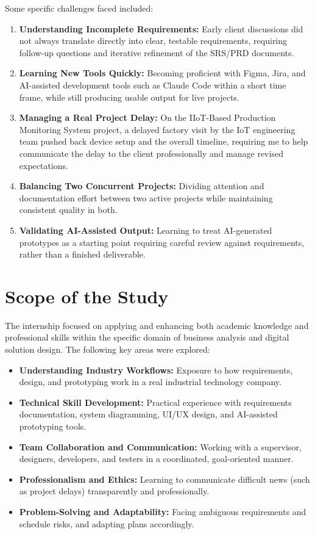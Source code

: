 \par Some specific challenges faced included:
\begin{enumerate}
    \item \textbf{Understanding Incomplete Requirements:} Early client discussions did not always translate directly into clear, testable requirements, requiring follow-up questions and iterative refinement of the SRS/PRD documents.
    \item \textbf{Learning New Tools Quickly:} Becoming proficient with Figma, Jira, and AI-assisted development tools such as Claude Code within a short time frame, while still producing usable output for live projects.
    \item \textbf{Managing a Real Project Delay:} On the IIoT-Based Production Monitoring System project, a delayed factory visit by the IoT engineering team pushed back device setup and the overall timeline, requiring me to help communicate the delay to the client professionally and manage revised expectations.
    \item \textbf{Balancing Two Concurrent Projects:} Dividing attention and documentation effort between two active projects while maintaining consistent quality in both.
    \item \textbf{Validating AI-Assisted Output:} Learning to treat AI-generated prototypes as a starting point requiring careful review against requirements, rather than a finished deliverable.
\end{enumerate}

\section{Scope of the Study}
\par The internship focused on applying and enhancing both academic knowledge and professional skills within the specific domain of business analysis and digital solution design. The following key areas were explored:

\begin{itemize}
    \item \textbf{Understanding Industry Workflows:} Exposure to how requirements, design, and prototyping work in a real industrial technology company.
    \item \textbf{Technical Skill Development:} Practical experience with requirements documentation, system diagramming, UI/UX design, and AI-assisted prototyping tools.
    \item \textbf{Team Collaboration and Communication:} Working with a supervisor, designers, developers, and testers in a coordinated, goal-oriented manner.
    \item \textbf{Professionalism and Ethics:} Learning to communicate difficult news (such as project delays) transparently and professionally.
    \item \textbf{Problem-Solving and Adaptability:} Facing ambiguous requirements and schedule risks, and adapting plans accordingly.
\end{itemize}

